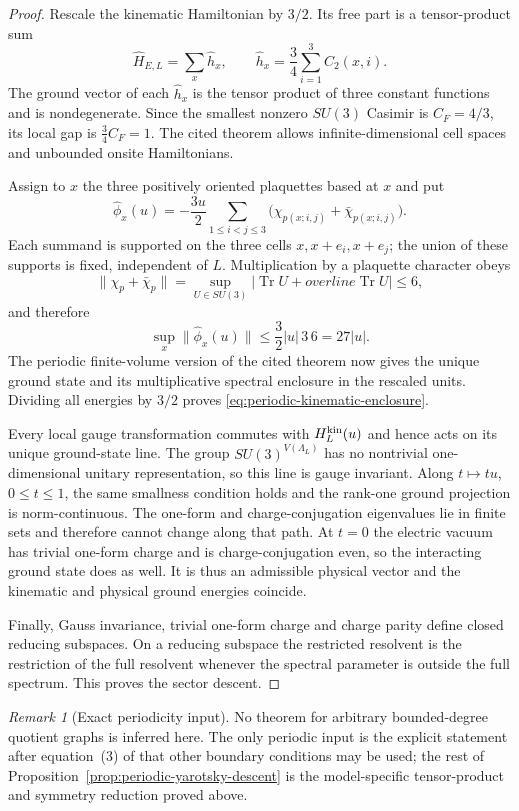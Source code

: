 \documentclass[11pt]{article}
\theoremstyle{plain}
\theoremstyle{definition}
\theoremstyle{remark}
\newtheorem{remark}[theorem]{Remark}
\begin{document}
\begin{proof}
Rescale the kinematic Hamiltonian by $3/2$.  Its free part is a tensor-product
sum
\[
 \widehat H_{E,L}=\sum_x\widehat h_x,
 \qquad
 \widehat h_x=\frac34\sum_{i=1}^3C_2(x,i).
\]
The ground vector of each $\widehat h_x$ is the tensor product of three
constant functions and is nondegenerate.  Since the smallest nonzero
$SU(3)$ Casimir is $C_F=4/3$, its local gap is
$\tfrac34C_F=1$.  The cited theorem allows infinite-dimensional cell spaces
and unbounded onsite Hamiltonians.

Assign to $x$ the three positively oriented plaquettes based at $x$ and put
\[
 \widehat\phi_x(u)=-\frac{3u}{2}
 \sum_{1\le i<j\le3}
 \bigl(\chi_{p(x;i,j)}+\bar\chi_{p(x;i,j)}\bigr).
\]
Each summand is supported on the three cells
$x,x+e_i,x+e_j$; the union of these supports is fixed, independent of $L$.
Multiplication by a plaquette character obeys
\[
 \|\chi_p+\bar\chi_p\|
 =\sup_{U\in SU(3)}|\operatorname{Tr}U+overline{\operatorname{Tr}U}|
 \le6,
\]
and therefore
\[
 \sup_x\|\widehat\phi_x(u)\|
 \le\frac32|u|\,3\,6=27|u|.
\]
The periodic finite-volume version of the cited theorem now gives the unique
ground state and its multiplicative spectral enclosure in the rescaled
units. Dividing all energies by $3/2$ proves
\eqref{eq:periodic-kinematic-enclosure}.

Every local gauge transformation commutes with $H_L^{\rm kin}(u)$ and hence
acts on its unique ground-state line.  The group $SU(3)^{V(\Lambda_L)}$ has no
nontrivial one-dimensional unitary representation, so this line is gauge
invariant.  Along $t\mapsto tu$, $0\le t\le1$, the same smallness condition
holds and the rank-one ground projection is norm-continuous.  The one-form
and charge-conjugation eigenvalues lie in finite sets and therefore cannot
change along that path.  At $t=0$ the electric vacuum has trivial one-form
charge and is charge-conjugation even, so the interacting ground state does
as well.  It is thus an admissible physical vector and the kinematic and
physical ground energies coincide.

Finally, Gauss invariance, trivial one-form charge and charge parity define
closed reducing subspaces.  On a reducing subspace the restricted resolvent
is the restriction of the full resolvent whenever the spectral parameter is
outside the full spectrum.  This proves the sector descent.
\end{proof}

\begin{remark}[Exact periodicity input]
No theorem for arbitrary bounded-degree quotient graphs is inferred here.
The only periodic input is the explicit statement after equation~(3) of
\cite{Yarotsky2004QP} that other boundary conditions may be used; the rest of
Proposition~\ref{prop:periodic-yarotsky-descent} is the model-specific
tensor-product and symmetry reduction proved above.
\end{remark}
\end{document}

